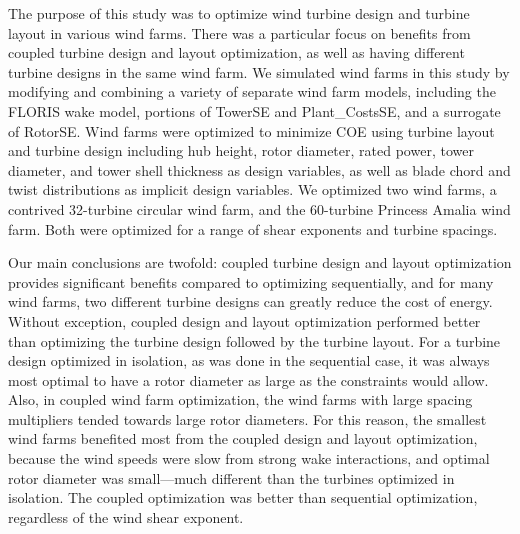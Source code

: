 The purpose of this study was to optimize wind turbine design and turbine layout in various wind farms. There was a particular focus on benefits from coupled turbine design and layout optimization, as well as having different turbine designs in the same wind farm. We simulated wind farms in this study by modifying and combining a variety of separate wind farm models, including the FLORIS wake model, portions of TowerSE and Plant\_CostsSE, and a surrogate of RotorSE. Wind farms were optimized to minimize COE using turbine layout and turbine design including hub height, rotor diameter, rated power, tower diameter, and tower shell thickness as design variables, as well as blade chord and twist distributions as implicit design variables. We optimized two wind farms, a contrived 32-turbine circular wind farm, and the 60-turbine Princess Amalia wind farm. Both were optimized for a range of shear exponents and turbine spacings. 

Our main conclusions are twofold: coupled turbine design and layout optimization provides significant benefits compared to optimizing sequentially,  and for many wind farms, two different turbine designs can greatly reduce the cost of energy. Without exception, coupled design and layout optimization performed better than optimizing the turbine design followed by the turbine layout. For a turbine design optimized in isolation, as was done in the sequential case, it was always most optimal to have a rotor diameter as large as the constraints would allow. Also, in coupled wind farm optimization, the wind farms with large spacing multipliers tended towards large rotor diameters. For this reason, the smallest wind farms benefited most from the coupled design and layout optimization, because the wind speeds were slow from strong wake interactions, and optimal rotor diameter was small---much different than the turbines optimized in isolation. The coupled optimization was  better than sequential optimization, regardless of the wind shear exponent. 

